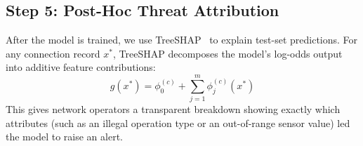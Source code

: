 \subsection{Step 5: Post-Hoc Threat Attribution}
After the model is trained, we use TreeSHAP~\cite{lundberg2017unified} to explain test-set predictions. For any connection record $x^*$, TreeSHAP decomposes the model's log-odds output into additive feature contributions:
\begin{equation}
g(x^*) = \phi_0^{(c)} + \sum_{j=1}^{m} \phi_j^{(c)}(x^*)
\label{eq:local_explanation}
\end{equation}
This gives network operators a transparent breakdown showing exactly which attributes (such as an illegal operation type or an out-of-range sensor value) led the model to raise an alert.
